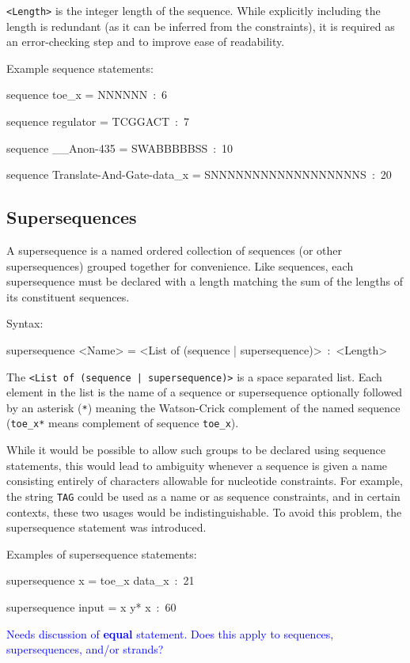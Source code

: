 \documentclass{article}
\newcommand{\add}[1]{\textcolor{blue}{#1}}
\newenvironment{code}
{\vspace{-0.1in}\par\begin{list}{}{
\setlength{\listparindent}{0pt}
\raggedright
\setlength{\itemsep}{0pt}
\setlength{\parsep}{0pt}
\normalfont\ttfamily}
 \item[]}
{\end{list}\vspace{-0.1in}}
\begin{document}
\texttt{<Length>} is the integer length of the sequence. While explicitly including the length is redundant (as it can be inferred from the constraints), it is required as an error-checking step and to improve ease of readability.

Example sequence statements:
\begin{code}
sequence toe\_x = NNNNNN~:~6

sequence regulator = TCGGACT~:~7

sequence \_\_Anon-435 = SWABBBBBSS~:~10

sequence Translate-And-Gate-data\_x = SNNNNNNNNNNNNNNNNNNS~:~20
\end{code}

\subsection{Supersequences}

A supersequence is a named ordered collection of sequences (or other supersequences) grouped together for convenience. Like sequences, each supersequence must be declared with a length matching the sum of the lengths of its constituent sequences.

Syntax:
\begin{code}
supersequence <Name> = <List of (sequence | supersequence)>~:~<Length>
\end{code}
The \texttt{<List of (sequence | supersequence)>} is a space separated list. Each element in the list is the name of a sequence or supersequence optionally followed by an asterisk (\texttt{*}) meaning the Watson-Crick complement of the named sequence (\texttt{toe\_x*} means complement of sequence \texttt{toe\_x}).

While it would be possible to allow such groups to be declared using sequence statements, this would lead to ambiguity whenever a sequence is given a name consisting entirely of characters allowable for nucleotide constraints. For example, the string \texttt{TAG} could be used as a name or as sequence constraints, and in certain contexts, these two usages would be indistinguishable. To avoid this problem, the supersequence statement was introduced.

Examples of supersequence statements:
\begin{code}
supersequence x = toe\_x data\_x~:~21

supersequence input = x y{*} x~:~60
\end{code}


\add{Needs discussion of {\bf equal} statement.  Does this apply to sequences, supersequences, and/or strands?}
\end{document}
